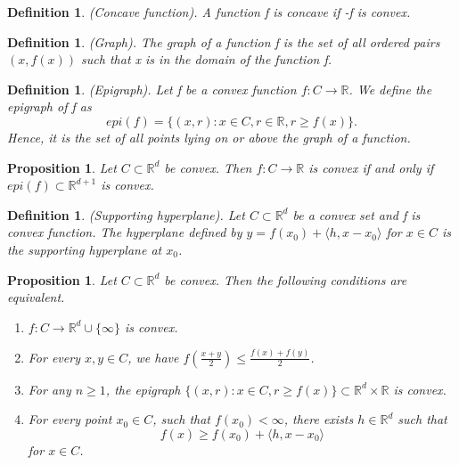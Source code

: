 \documentclass[twoside]{article}
\newtheorem{proposition}[theorem]{Proposition}
\newtheorem{definition}[theorem]{Definition}
\begin{document}
\begin{definition}(Concave function). A function f is concave if -f is convex.
\end{definition}

\begin{definition}(Graph). The graph of a function f is the set of all ordered pairs $(x,f(x))$ such that x is in the domain of the function f.
\end{definition}

\begin{definition}(Epigraph). Let f be a convex function $f: C \rightarrow \mathbb{R}$. We define the epigraph of f as 
$$
epi(f) = \{(x,r): x \in C, r \in \mathbb{R}, r \geq f(x)\}.
$$
Hence, it is the set of all points lying on or above the graph of a function.
\end{definition}

\begin{proposition} Let $C \subset \mathbb{R}^d$ be convex. Then $f: C \rightarrow \mathbb{R}$ is convex if and only if $epi(f) \subset \mathbb{R}^{d+1}$ is convex.
\end{proposition}

\begin{definition}(Supporting hyperplane). Let $C \subset \mathbb{R}^d$ be a convex set and f is convex function. The hyperplane defined by $y = f(x_0) + \langle h, x-x_0 \rangle$ for $x \in C$ is the supporting hyperplane at $x_0$.
\end{definition}

\begin{proposition}Let $C \subset \mathbb{R}^d$ be convex. Then the following conditions are equivalent.
\begin{enumerate}
\item $f: C \rightarrow \mathbb{R}^d \cup \{\infty\}$ is convex.
\item For every $x, y \in C$, we have $f(\frac{x+y}{2}) \leq \frac{f(x) + f(y)}{2}$.
\item For any $n \geq 1$, the epigraph $\{(x,r): x \in C, r \geq f(x)\} \subset \mathbb{R}^d \times \mathbb{R}$ is convex.
\item For every point $x_0 \in C$, such that $f(x_0) < \infty$, there exists $h \in \mathbb{R}^d$ such that 
$$
f(x) \geq f(x_0) + \langle h, x-x_0\rangle
$$
for $x \in C$.
\end{enumerate}
\end{proposition}
\end{document}
